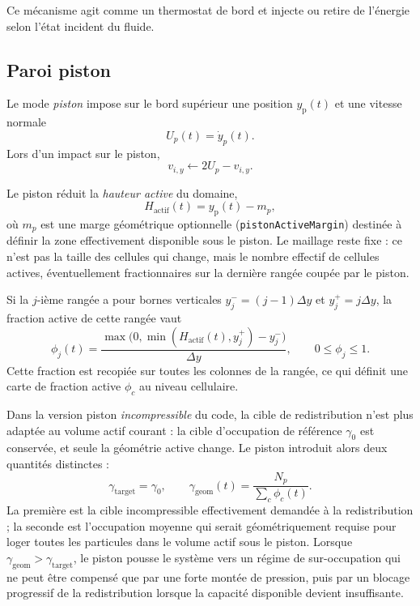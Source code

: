 \documentclass[11pt,a4paper]{article}
\begin{document}
Ce mécanisme agit comme un thermostat de bord et injecte ou retire de l'énergie selon l'état incident du fluide.

\subsection{Paroi piston}

Le mode \emph{piston} impose sur le bord supérieur une position $y_{\mathrm{p}}(t)$ et une vitesse normale
\begin{equation}
 U_p(t) = \dot y_p(t).
\end{equation}
Lors d'un impact sur le piston,
\begin{equation}
 v_{i,y} \leftarrow 2U_p - v_{i,y}.
\end{equation}

Le piston réduit la \emph{hauteur active} du domaine,
\begin{equation}
 H_{\mathrm{actif}}(t)=y_{\mathrm{p}}(t)-m_p,
\end{equation}
où $m_p$ est une marge géométrique optionnelle (\verb|pistonActiveMargin|) destinée à définir la zone effectivement disponible sous le piston. Le maillage reste fixe : ce n'est pas la taille des cellules qui change, mais le nombre effectif de cellules actives, éventuellement fractionnaires sur la dernière rangée coupée par le piston.

Si la $j$-ième rangée a pour bornes verticales $y_j^-=(j-1)\Delta y$ et $y_j^+=j\Delta y$, la fraction active de cette rangée vaut
\begin{equation}
 \phi_j(t)=\frac{\max\!\bigl(0,\min(H_{\mathrm{actif}}(t),y_j^+)-y_j^-\bigr)}{\Delta y},
 \qquad 0\le \phi_j\le 1.
\end{equation}
Cette fraction est recopiée sur toutes les colonnes de la rangée, ce qui définit une carte de fraction active \(\phi_c\) au niveau cellulaire.

Dans la version piston \emph{incompressible} du code, la cible de redistribution n'est plus adaptée au volume actif courant : la cible d'occupation de référence \(\gamma_0\) est conservée, et seule la géométrie active change. Le piston introduit alors deux quantités distinctes :
\begin{equation}
 \gamma_{\mathrm{target}} = \gamma_0,
 \qquad
 \gamma_{\mathrm{geom}}(t)=\frac{N_p}{\sum_c \phi_c(t)}.
\end{equation}
La première est la cible incompressible effectivement demandée à la redistribution ; la seconde est l'occupation moyenne qui serait géométriquement requise pour loger toutes les particules dans le volume actif sous le piston. Lorsque \(\gamma_{\mathrm{geom}}>\gamma_{\mathrm{target}}\), le piston pousse le système vers un régime de sur-occupation qui ne peut être compensé que par une forte montée de pression, puis par un blocage progressif de la redistribution lorsque la capacité disponible devient insuffisante.
\end{document}
